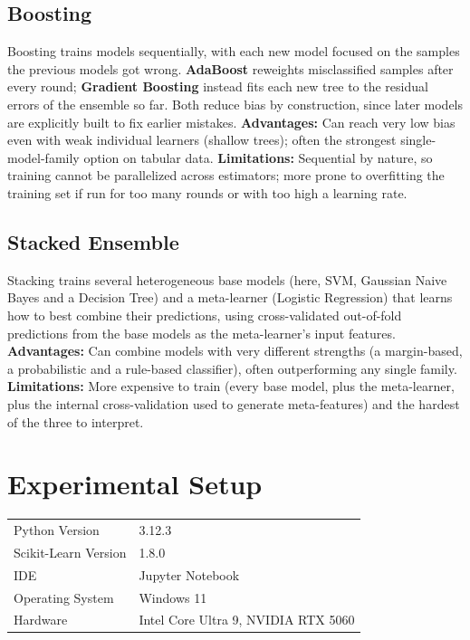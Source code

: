 \documentclass[12pt,a4paper]{article}
\begin{document}
\subsection*{Boosting}
Boosting trains models sequentially, with each new model focused on the samples the previous
models got wrong. \textbf{AdaBoost} reweights misclassified samples after every round;
\textbf{Gradient Boosting} instead fits each new tree to the residual errors of the ensemble so
far. Both reduce bias by construction, since later models are explicitly built to fix earlier
mistakes.
\textbf{Advantages:} Can reach very low bias even with weak individual learners (shallow
trees); often the strongest single-model-family option on tabular data.
\textbf{Limitations:} Sequential by nature, so training cannot be parallelized across
estimators; more prone to overfitting the training set if run for too many rounds or with too
high a learning rate.

\subsection*{Stacked Ensemble}
Stacking trains several heterogeneous base models (here, SVM, Gaussian Naive Bayes and a
Decision Tree) and a meta-learner (Logistic Regression) that learns how to best combine their
predictions, using cross-validated out-of-fold predictions from the base models as the
meta-learner's input features.
\textbf{Advantages:} Can combine models with very different strengths (a margin-based, a
probabilistic and a rule-based classifier), often outperforming any single family.
\textbf{Limitations:} More expensive to train (every base model, plus the meta-learner, plus
the internal cross-validation used to generate meta-features) and the hardest of the three to
interpret.

\section{Experimental Setup}
\begin{tabular}{ll}
\toprule
Python Version & 3.12.3 \\
Scikit-Learn Version & 1.8.0 \\
IDE & Jupyter Notebook \\
Operating System & Windows 11 \\
Hardware & Intel Core Ultra 9, NVIDIA RTX 5060 \\
\bottomrule
\end{tabular}
\end{document}

